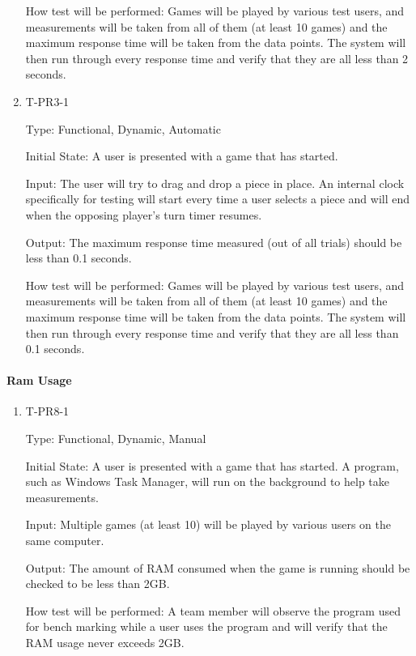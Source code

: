 \documentclass[12pt, titlepage]{article}
\begin{document}
\begin{enumerate}
                How test will be performed: Games will be played by various test users, and measurements will be taken from all of them (at least 10 games) and the maximum response time will be taken from the data points. The system will then run through every response time and verify that they are all less than 2 seconds.
            
            \item{T-PR3-1\\}
            
                Type: Functional, Dynamic, Automatic
                		
                Initial State: A user is presented with a game that has started.
        
                Input: The user will try to drag and drop a piece in place. An
                internal clock specifically for testing will start every time a user selects a piece and will end when the opposing player's turn timer resumes.
                					
                Output: The maximum response time measured (out of all trials) should be less than 0.1 seconds.
                					
                How test will be performed: Games will be played by various test users, and measurements will be taken from all of them (at least 10 games) and the maximum response time will be taken from the data points. The system will then run through every response time and verify that they are all less than 0.1 seconds.
                
        \end{enumerate}
        
    \paragraph{Ram Usage}
        
        \begin{enumerate}
            \item{T-PR8-1\\}
            
                Type: Functional, Dynamic, Manual
                					
                Initial State: A user is presented with a game that has started. A program, such as Windows Task Manager, will run on the background to help take measurements.
            					
                Input: Multiple games (at least 10) will be played by various users on the same computer.
                					
                Output: The amount of RAM consumed when the game is running should be checked to be less than 2GB.
                					
                How test will be performed: A team member will observe the program used for bench marking while a user uses the program and will verify that the RAM usage never exceeds 2GB.
            
        \end{enumerate}
\end{document}
